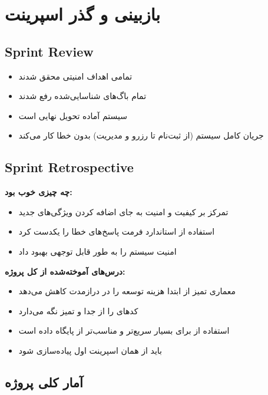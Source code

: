 \documentclass[12pt, a4paper]{article}
\begin{document}
\newpage

\section{بازبینی و گذر اسپرینت}

\subsection{Sprint Review}
\begin{itemize}[rightmargin=0.5cm]
  \item تمامی اهداف امنیتی محقق شدند
  \item تمام باگ‌های شناسایی‌شده رفع شدند
  \item سیستم آماده تحویل نهایی است
  \item جریان کامل سیستم (از ثبت‌نام تا رزرو و مدیریت) بدون خطا کار می‌کند
\end{itemize}

\subsection{Sprint Retrospective}

\textbf{چه چیزی خوب بود:}
\begin{itemize}[rightmargin=0.5cm]
  \item تمرکز بر کیفیت و امنیت به جای اضافه کردن ویژگی‌های جدید
  \item استفاده از استاندارد  فرمت پاسخ‌های خطا را یکدست کرد
  \item {} امنیت سیستم را به طور قابل توجهی بهبود داد
\end{itemize}

\textbf{درس‌های آموخته‌شده از کل پروژه:}
\begin{itemize}[rightmargin=0.5cm]
  \item معماری تمیز از ابتدا هزینه توسعه را در درازمدت کاهش می‌دهد
  \item {} کدهای  را از  جدا و
    تمیز نگه می‌دارد
  \item استفاده از  برای  بسیار سریع‌تر و مناسب‌تر از پایگاه داده است
  \item {} باید از همان اسپرینت اول پیاده‌سازی شود
\end{itemize}

\subsection{آمار کلی پروژه}
\end{document}
